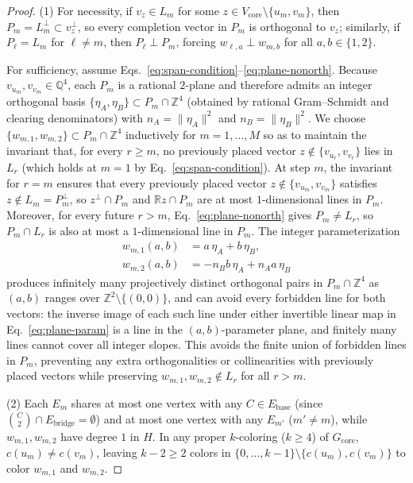 \documentclass[
  aps,
  pra,
  reprint,
  superscriptaddress,
  amsmath,
  amssymb,
  nofootinbib,
  floatfix
]{revtex4-2}
\theoremstyle{definition}
\theoremstyle{remark}
\newcommand{\R}{\mathbb{R}}
\newcommand{\Q}{\mathbb{Q}}
\begin{document}
\begin{proof}
(1) For necessity, if $v_z\in L_m$ for some $z\in V_{\mathrm{core}}\setminus\{u_m,v_m\}$, then $P_m=L_m^\perp\subset v_z^\perp$, so every completion vector in $P_m$ is orthogonal to $v_z$; similarly, if $P_\ell=L_m$ for $\ell\ne m$, then $P_\ell\perp P_m$, forcing $w_{\ell,a}\perp w_{m,b}$ for all $a,b\in\{1,2\}$.

For sufficiency, assume Eqs.~\eqref{eq:span-condition}--\eqref{eq:plane-nonorth}. Because $v_{u_m},v_{v_m}\in\Q^4$, each $P_m$ is a rational $2$-plane and therefore admits an integer orthogonal basis $\{\eta_A,\eta_B\}\subset P_m\cap\mathbb{Z}^4$ (obtained by rational Gram--Schmidt and clearing denominators) with $n_A=\|\eta_A\|^2$ and $n_B=\|\eta_B\|^2$. We choose $\{w_{m,1},w_{m,2}\}\subset P_m\cap\mathbb{Z}^4$ inductively for $m=1,\ldots,M$ so as to maintain the invariant that, for every $r\ge m$, no previously placed vector $z\notin\{v_{u_r},v_{v_r}\}$ lies in $L_r$ (which holds at $m=1$ by Eq.~\eqref{eq:span-condition}). At step $m$, the invariant for $r=m$ ensures that every previously placed vector $z\notin\{v_{u_m},v_{v_m}\}$ satisfies $z\notin L_m=P_m^\perp$, so $z^\perp\cap P_m$ and $\R z\cap P_m$ are at most $1$-dimensional lines in $P_m$. Moreover, for every future $r>m$, Eq.~\eqref{eq:plane-nonorth} gives $P_m\ne L_r$, so $P_m\cap L_r$ is also at most a $1$-dimensional line in $P_m$. The integer parameterization
\begin{equation}\label{eq:plane-param}
\begin{aligned}
w_{m,1}(a,b)&=a\,\eta_A+b\,\eta_B,\\
w_{m,2}(a,b)&=-n_B b\,\eta_A+n_A a\,\eta_B
\end{aligned}
\end{equation}
produces infinitely many projectively distinct orthogonal pairs in $P_m\cap\mathbb{Z}^4$ as $(a,b)$ ranges over $\mathbb{Z}^2\setminus\{(0,0)\}$, and can avoid every forbidden line for both vectors: the inverse image of each such line under either invertible linear map in Eq.~\eqref{eq:plane-param} is a line in the $(a,b)$-parameter plane, and finitely many lines cannot cover all integer slopes. This avoids the finite union of forbidden lines in $P_m$, preventing any extra orthogonalities or collinearities with previously placed vectors while preserving $w_{m,1},w_{m,2}\notin L_r$ for all $r>m$.

(2) Each $E_m$ shares at most one vertex with any $C\in E_{\mathrm{base}}$ (since $\binom{C}{2}\cap E_{\mathrm{bridge}}=\emptyset$) and at most one vertex with any $E_{m'}$ ($m'\ne m$), while $w_{m,1},w_{m,2}$ have degree $1$ in $H$. In any proper $k$-coloring ($k\ge4$) of $G_{\mathrm{core}}$, $c(u_m)\ne c(v_m)$, leaving $k-2\ge2$ colors in $\{0,\ldots,k-1\}\setminus\{c(u_m),c(v_m)\}$ to color $w_{m,1}$ and $w_{m,2}$.


\end{proof}
\end{document}
